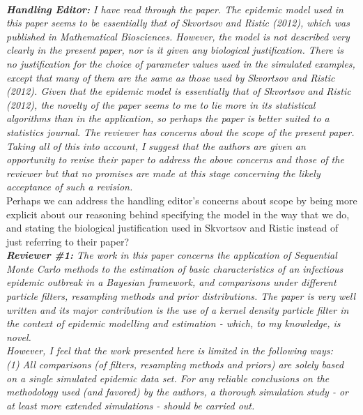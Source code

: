 \documentclass{article}
\begin{document}
 \\

\noindent \emph{{\bf Handling Editor:}  I have read through the paper.  The epidemic model used in this paper seems to be essentially that of Skvortsov and Ristic (2012), which was published in Mathematical Biosciences.  However, the model is not described very clearly in the present paper, nor is it given any biological justification.  There is no justification for the choice of parameter values used in the simulated examples, except that many of them are the same as those used by Skvortsov and Ristic (2012).  Given that the epidemic model is essentially that of Skvortsov and Ristic (2012), the novelty of the paper seems to me to lie more in its statistical algorithms than in the application, so perhaps the paper is better suited to a statistics journal.  The reviewer has concerns about the scope of the present paper.  Taking all of this into account, I suggest that the authors are given an opportunity to revise their paper to address the above concerns and those of the reviewer but that no promises are made at this stage concerning the likely acceptance of such a revision.} \\

Perhaps we can address the handling editor's concerns about scope by being more explicit about our reasoning behind specifying the model in the way that we do, and stating the biological justification used in Skvortsov and Ristic instead of just referring to their paper? \\

\noindent \emph{{\bf Reviewer \#1:} The work in this paper concerns the application of Sequential Monte Carlo methods to the estimation of basic characteristics of an infectious epidemic outbreak in a Bayesian framework, and comparisons under different particle filters, resampling methods and prior distributions. The paper is very well written and its major contribution is the use of a kernel density particle filter in the context of epidemic modelling and estimation - which, to my knowledge, is novel.} \\

\noindent \emph{However, I feel that the work presented here is limited in the following ways:} \\

\noindent \emph{(1) All comparisons (of filters, resampling methods and priors) are solely based on a single simulated epidemic data set. For any reliable conclusions on the methodology used (and favored) by the authors, a thorough simulation study - or at least more extended simulations - should be carried out.} \\
\end{document}
